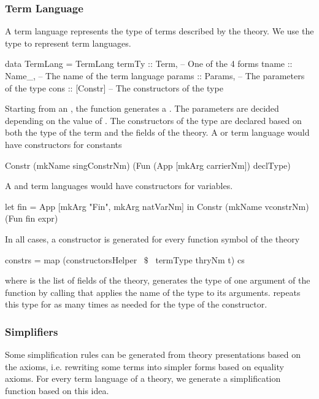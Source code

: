 \subsubsection{Term Language}
\label{subsec:term_lang}
A term language represents the type of terms described by the theory. We use the  type to represent term languages.  
\begin{hscode}
data TermLang = TermLang {
  termTy  :: Term,    -- One of the 4 forms 
  tname   :: Name_,   -- The name of the term language 
  params  :: Params,  -- The parameters of the type 
  cons    :: [Constr] -- The constructors of the type 
}
\end{hscode}
Starting from an , the function  generates a . The parameters are decided depending on the value of . The constructors of the type are declared based on both the type of the term and the fields of the theory. A  or  term language would have constructors for constants
\begin{hscode} 
Constr (mkName singConstrNm)
    (Fun (App [mkArg carrierNm]) declType)
\end{hscode} 
\noindent A  and  term languages would have constructors for variables. 
\begin{hscode} 
 let fin = App [mkArg "Fin", mkArg natVarNm]
 in Constr (mkName vconstrNm) (Fun fin expr) 
\end{hscode} 
\noindent In all cases, a constructor is generated for every function symbol of the theory 
\begin{hscode} 
constrs = map (constructorsHelper ~$\$$~ termType thryNm t) cs
\end{hscode} 
\noindent where  is the list of fields of the theory, 
  generates the type of one argument of the function by calling  that applies the name of the type to its arguments.
 repeats this type for as many times as needed for the type of the constructor. 

\subsubsection{Simplifiers}
\label{sec:generation:simplifier}
Some simplification rules can be generated from theory presentations based on the axioms, i.e. rewriting some terms into simpler forms based on equality axioms. For every term language of a theory, we generate a simplification function based on this idea. 


